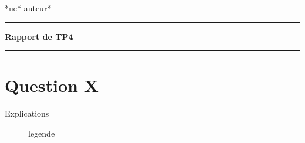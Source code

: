 \documentclass[a4paper, 14pt]{article}
\begin{document}
\newcommand{\HRule}{\rule{\linewidth}{0.5mm}}

\begin{center}
\noindent
*ue* \hfill *auteur*
\vspace{.2cm}
\hrule 
\begin{center} \large \textbf{Rapport de TP4}\end{center}
\hrule
\vspace{.2cm}
\end{center}

\tableofcontents

\medskip
\section{Question X}
Explications

\begin{figure}[H]
    \centering
    \qquad
    \caption{legende}
    \label{fig:example}
\end{figure}


\newpage
\end{document}
